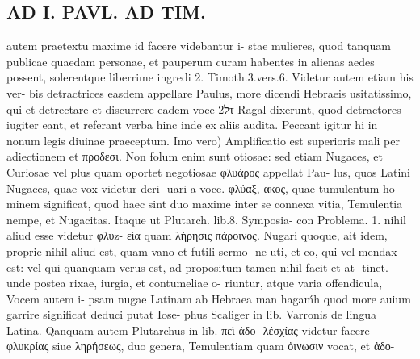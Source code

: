 \documentclass{article}
\begin{document}
\begin{pages}
\section*{AD I. PAVL. AD TIM. }
\marginpar{[ p.286 ]}autem praetextu maxime id facere videbantur i- stae mulieres, quod tanquam publicae quaedam personae, et pauperum curam habentes in alienas aedes possent, solerentque liberrime ingredi 2. Timoth.3.vers.6. Videtur autem etiam his ver- bis detractrices easdem appellare Paulus, more dicendi Hebraeis usitatissimo, qui et detrectare et discurrere eadem voce 2לτ Ragal dixerunt, quod detractores iugiter eant, et referant verba hinc inde ex aliis audita. Peccant igitur hi in nonum legis diuinae praeceptum. Imo vero) Amplificatio est superioris mali per adiectionem et προδεσι. Non folum enim sunt otiosae: sed etiam Nugaces, et Curiosae vel plus quam oportet negotiosae φλυάρος appellat Pau- lus, quos Latini Nugaces, quae vox videtur deri- uari a voce. φλύαξ, ακος, quae tumulentum ho- minem significat, quod haec sint duo maxime inter se connexa vitia, Temulentia nempe, et Nugacitas. Itaque ut Plutarch. lib.8. Symposia- con Problema. 1. nihil aliud esse videtur φλυz- εία quam λήρησις πάροινος. Nugari quoque, ait idem, proprie nihil aliud est, quam vano et futili sermo- ne uti, et eo, qui vel mendax est: vel qui quanquam verus est, ad propositum tamen nihil facit et at- tinet. unde postea rixae, iurgia, et contumeliae o- riuntur, atque varia offendicula, Vocem autem i- psam nugae Latinam ab Hebraea man hagaḿh quod more auium garrire significat deduci putat Iose- phus Scaliger in lib. Varronis de lingua Latina. Qanquam autem Plutarchus in lib. πεὶ ἀδο- λέσχίας videtur facere φλυκρίας siue ληρήσεως, duo genera, Temulentiam quam ὀινωσιν vocat, et ἀδο- 

\end{pages}
\end{document}
